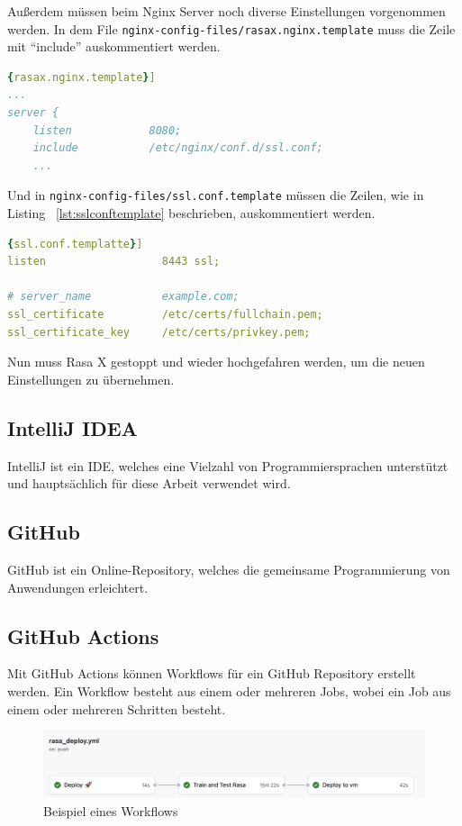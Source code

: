 Außerdem müssen beim Nginx Server noch diverse Einstellungen vorgenommen werden.
In dem File \texttt{nginx-config-files/rasax.nginx.template} muss die Zeile mit ``include'' auskommentiert werden.

\begin{lstlisting}[language=yaml,label={lst:rasaxnginxtemplate},caption={rasax.nginx.template}]{rasax.nginx.template}]
...
server {
    listen            8080;
    include           /etc/nginx/conf.d/ssl.conf;
    ...
\end{lstlisting}

Und in \texttt{nginx-config-files/ssl.conf.template} müssen die Zeilen, wie in Listing ~\ref{lst:sslconftemplate} beschrieben, auskommentiert werden.

\begin{lstlisting}[language=yaml,label={lst:sslconftemplate},caption={ssl.conf.template}]{ssl.conf.templatte}]
listen                  8443 ssl;

# server_name           example.com;
ssl_certificate         /etc/certs/fullchain.pem;
ssl_certificate_key     /etc/certs/privkey.pem;
\end{lstlisting}

Nun muss Rasa X gestoppt und wieder hochgefahren werden, um die neuen Einstellungen zu übernehmen.

\subsection{IntelliJ IDEA}
IntelliJ ist ein IDE, welches eine Vielzahl von Programmiersprachen unterstützt und hauptsächlich für diese Arbeit verwendet wird.

\subsection{GitHub}
GitHub ist ein Online-Repository, welches die gemeinsame Programmierung von Anwendungen erleichtert.

\subsection{GitHub Actions}\label{subsec:github-actions}
Mit GitHub Actions können Workflows für ein GitHub Repository erstellt werden.
Ein Workflow besteht aus einem oder mehreren Jobs, wobei ein Job aus einem oder mehreren Schritten besteht.

\begin{figure}[hbt!]
    \centering
    \includegraphics[scale=0.5]{pics/ghActions}
    \caption{Beispiel eines Workflows}
    \label{fig:impl:ghActions}
\end{figure}

